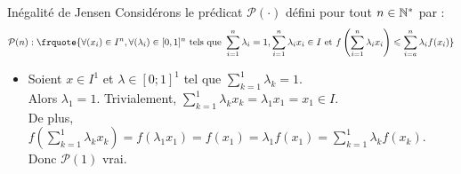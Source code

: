 \documentclass{article}
\begin{document}
\begin{question_kholle}
	[{Soit $f : I \longrightarrow \R$ convexe sur $I$. Alors, pour tout $n\in\N^{*}$, pour tous $(x_{1},\dots,x_{n})\in I^{n}$ et tous $(\lambda_{1}, \dots, \lambda_{n})\in[0,1]^{n}$ tels que $\sum_{i=1}^{n}\lambda_{i}=1$,
	\begin{equation}
		\sum_{k=1}^{n} \lambda_k x_k \in I \quad\text{et}\quad
		f\left( \sum_{k=1}^{n} \lambda_k x_k \right)
		\leqslant \sum_{k=1}^{n} \lambda_k f\left( x_k \right)
	\end{equation}}]
	{Inégalité de Jensen}
	Considérons le prédicat $\mathcal{P}(\cdot)$ défini pour tout $n \in \mathbb N^*$ par :
	\begin{equation*}
		\mathcal{P}(n):\frquote{\displaystyle\forall(x_{i})\in I^{n}, \forall (\lambda_{i})\in[0,1]^{n} \text{ tels que } \sum_{i=1}^{n}\lambda_{i}=1, \sum_{i=1}^{n}\lambda_{i}x_{i}\in I \text{ et } f \left(\sum_{i=1}^{n}\lambda_{i}x_{i}\right)\leq \sum_{i=a}^{n}\lambda_{i}f(x_{i})}
	\end{equation*}

	\begin{itemize}[label=$*$, leftmargin=0.5cm]
		\item Soient $x \in I^1$ et $\lambda \in [0;1]^1$ tel que $\sum_{k=1}^{1} \lambda_k = 1$. \\
		      Alors $\lambda_1 = 1$. Trivialement, $\sum_{k=1}^{1} \lambda_k x_k = \lambda_1 x_1 = x_1 \in I$. \\
		      De plus, $f\left( \sum_{k=1}^{1} \lambda_k x_k \right)
			      = f\left( \lambda_1 x_1 \right)
			      = f\left( x_1 \right)
			      = \lambda_1 f\left( x_1 \right)
			      = \sum_{k=1}^{1} \lambda_k f\left( x_k \right)$. \\
		      Donc $\mathcal{P}(1)$ vrai.


\end{itemize}
\end{question_kholle}
\end{document}
